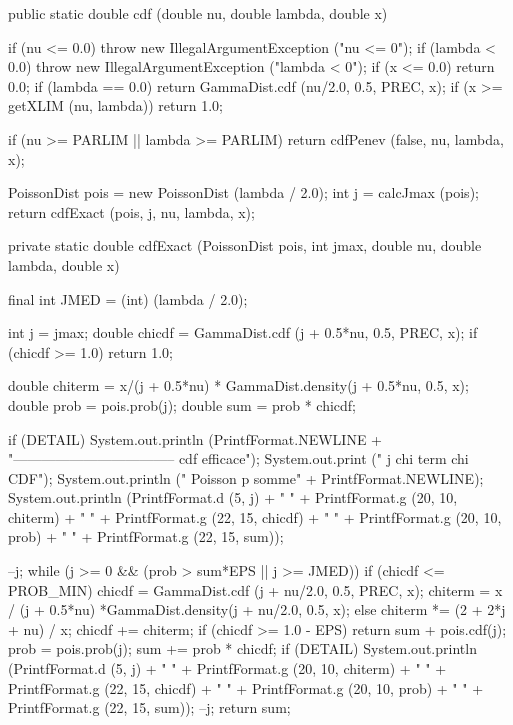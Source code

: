 \begin{code}

   public static double cdf (double nu, double lambda, double x)\begin{hide} {
      if (nu <= 0.0)
         throw new IllegalArgumentException ("nu <= 0");
      if (lambda < 0.0)
         throw new IllegalArgumentException ("lambda < 0");
      if (x <= 0.0)
         return 0.0;
      if (lambda == 0.0)
         return GammaDist.cdf (nu/2.0, 0.5, PREC, x);
      if (x >= getXLIM (nu, lambda))
         return 1.0;

      if (nu >= PARLIM || lambda >= PARLIM)
         return cdfPenev (false, nu, lambda, x);

      PoissonDist pois = new PoissonDist (lambda / 2.0);
      int j = calcJmax (pois);
      return cdfExact (pois, j, nu, lambda, x);
   }


   private static double cdfExact (PoissonDist pois, int jmax, double nu,
         double lambda, double x) {
      final int JMED = (int) (lambda / 2.0);

      int j = jmax;
      double chicdf = GammaDist.cdf (j + 0.5*nu, 0.5, PREC, x);
      if (chicdf >= 1.0) return 1.0;

      double chiterm = x/(j + 0.5*nu) * GammaDist.density(j + 0.5*nu, 0.5, x);
      double prob = pois.prob(j);
      double sum = prob * chicdf;

      if (DETAIL) {
         System.out.println (PrintfFormat.NEWLINE +
             "----------------------------------- cdf efficace");
         System.out.print ("   j            chi term                chi CDF");
         System.out.println ("                   Poisson p            somme" +
             PrintfFormat.NEWLINE);
         System.out.println (PrintfFormat.d (5, j) + "   " +
                             PrintfFormat.g (20, 10, chiterm) + "   " +
                             PrintfFormat.g (22, 15, chicdf) + "   " +
                             PrintfFormat.g (20, 10, prob) + "   " +
                             PrintfFormat.g (22, 15, sum));
      }

      --j;
      while (j >= 0 && (prob > sum*EPS || j >= JMED)) {
         if (chicdf <= PROB_MIN) {
             chicdf = GammaDist.cdf (j + nu/2.0, 0.5, PREC, x);
             chiterm = x / (j + 0.5*nu) *GammaDist.density(j + nu/2.0, 0.5, x);
         } else {
            chiterm *= (2 + 2*j + nu) / x;
            chicdf += chiterm;
         }
         if (chicdf >= 1.0 - EPS)
            return sum + pois.cdf(j);
         prob = pois.prob(j);
         sum += prob * chicdf;
         if (DETAIL) {
            System.out.println (PrintfFormat.d (5, j) + "   " +
                                PrintfFormat.g (20, 10, chiterm) + "   " +
                                PrintfFormat.g (22, 15, chicdf) + "   " +
                                PrintfFormat.g (20, 10, prob) + "   " +
                                PrintfFormat.g (22, 15, sum));
         }
         --j;
      }
      return sum;
   }


\end{hide}
\end{code}
